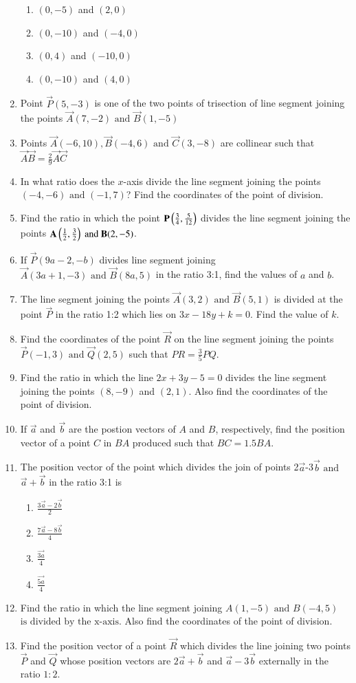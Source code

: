 \begin{enumerate}[label=\thesubsection.\arabic*,ref=\thesubsection.\theenumi]
\begin{enumerate}
	\item$(0,-5)$ and $(2,0)$
	\item$(0,-10)$ and $(-4,0)$
	\item$(0,4)$ and  $(-10,0)$
	\item$(0,-10)$ and $(4,0)$
\end{enumerate}
\item Point $\vec{P}(5,-3)$ is one of the two points of trisection of line segment joining the points $\vec{A}(7,-2)\text{ and }\vec{B}(1,-5)$
\item Points $\vec{A}(-6,10),\vec{B}(-4,6) \text{ and } \vec{C}(3,-8)$ are collinear such that $\vec{A}\vec{B}=  \frac{2}{9}\vec{A}\vec{C}$
\item In what ratio does the $x$-axis divide the line segment joining the points $(-4,-6)\text{ and }(-1,7)$? Find the coordinates of the point of division.
\item Find the ratio in which the point $\mathbf{P}\left(\frac{3}{4},\frac{5}{12}\right)$ divides the line segment joining the points $\mathbf{A}\left(\frac{1}{2},\frac{3}{2}\right)\text{ and } \mathbf{B}(2,-5)$.
\item If $\vec{P}(9a-2,-b)$ divides line segment joining $\vec{A}(3a+1,-3)\text{ and }\vec{B}(8a,5)$ in the ratio 3:1, find the values of $a$ and $b$.
\item The line segment joining the points $\vec{A}(3,2)\text{ and }\vec{B}(5,1)$ is divided at the point $\vec{P}$ in the ratio 1:2 which lies on $3x-18y+k=0$. Find the value of $k$.  
\item Find the coordinates of the point $\vec{R}$ on the line segment joining the points $\vec{P}(-1,3)\text{ and }\vec{Q}(2,5)$ such that $PR=\frac{3}{5}PQ$.
\item Find the ratio in which the line $2x+3y-5=0$ divides the line segment joining the points $(8,-9)$ and $(2,1)$. Also find the coordinates of the point of division.
\item If $\vec{a}$ and $\vec{b}$ are the postion vectors of $A$ and $B$, respectively, find the position vector of a point $C$ in $BA$ produced such that $BC=1.5BA$.
\item The position vector of the point which divides the join of points 2$\vec{a}$-3$\vec{b}$ $\text{and}$ $\vec{a}+\vec{b}$ in the ratio 3:1 is
	\begin{enumerate}
\item $\frac{3\vec{a}-2\vec{b}}{2}$
\item $\frac{7\vec{a}-8\vec{b}}{4}$
\item $\frac{\vec{3a}}{4}$
\item $\frac{\vec{5a}}{4}$
\end{enumerate}
\item Find the ratio in which the line segment joining $A(1,-5) \text{ and } B(-4,5)$ $\text{is divided by the x-axis}$. Also find the coordinates of the point of division.
\item Find the position vector of a point $\vec{R}$ which divides the line joining two points $\vec{P}$ and $\vec{Q}$ whose position vectors are $2\vec{a}+\vec{b}$ and $\vec{a}-3\vec{b}$ externally in the ratio $1:2$.
\end{enumerate}
